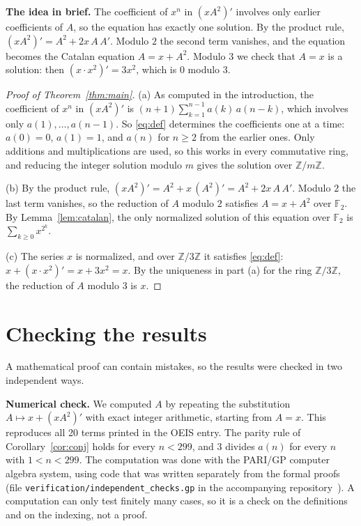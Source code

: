 \documentclass[11pt,a4paper]{article}
\theoremstyle{definition}
\theoremstyle{remark}
\newcommand{\Z}{\mathbb{Z}}
\newcommand{\F}{\mathbb{F}}
\newcommand{\para}[1]{\par\medskip\noindent\textbf{#1}\enspace}
\begin{document}
\para{The idea in brief.} The coefficient of $x^n$ in $(xA^2)'$ involves only earlier coefficients of $A$, so the
equation has exactly one solution. By the product rule, $(xA^2)'=A^2+2x\,A\,A'$. Modulo $2$ the second term vanishes, and
the equation becomes the Catalan equation $A=x+A^2$. Modulo $3$ we check that $A=x$ is a solution: then
$(x\cdot x^2)'=3x^2$, which is $0$ modulo $3$.

\begin{proof}[Proof of Theorem~\ref{thm:main}]
(a) As computed in the introduction, the coefficient of $x^n$ in $(xA^2)'$ is $(n+1)\sum_{k=1}^{n-1}a(k)\,a(n-k)$, which
involves only $a(1),\dots,a(n-1)$. So \eqref{eq:def} determines the coefficients one at a time: $a(0)=0$, $a(1)=1$, and
$a(n)$ for $n\ge2$ from the earlier ones. Only additions and multiplications are used, so this works in every commutative
ring, and reducing the integer solution modulo $m$ gives the solution over $\Z/m\Z$.

(b) By the product rule, $(xA^2)'=A^2+x\,(A^2)'=A^2+2x\,A\,A'$. Modulo $2$ the last term vanishes, so the reduction of
$A$ modulo $2$ satisfies $A=x+A^2$ over $\F_2$. By Lemma~\ref{lem:catalan}, the only normalized solution of this
equation over $\F_2$ is $\sum_{k\ge0}x^{2^k}$.

(c) The series $x$ is normalized, and over $\Z/3\Z$ it satisfies \eqref{eq:def}: $x+(x\cdot x^2)'=x+3x^2=x$. By the
uniqueness in part (a) for the ring $\Z/3\Z$, the reduction of $A$ modulo $3$ is $x$.
\end{proof}

\section{Checking the results}\label{sec:checks}

A mathematical proof can contain mistakes, so the results were checked in two independent ways.

\para{Numerical check.}
We computed $A$ by repeating the substitution $A\mapsto x+(xA^2)'$ with exact integer arithmetic, starting from
$A=x$. This reproduces all 20 terms printed in the OEIS entry. The parity rule of Corollary~\ref{cor:conj} holds for
every $n<299$, and $3$ divides $a(n)$ for every $n$ with $1<n<299$.
The computation was done with the PARI/GP computer algebra system, using code that was written separately from the
formal proofs (file \texttt{verification/independent\_checks.gp} in the accompanying repository~\cite{repo}).
A computation can only test finitely many cases, so it is a check on the definitions and on the indexing, not a proof.
\end{document}
